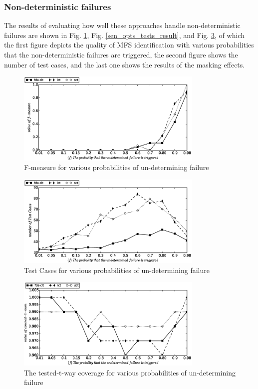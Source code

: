 \documentclass[journal,12pt,onecolumn,draftclsnofoot,]{IEEEtran}
\begin{document}
\subsubsection{Non-deterministic failures}
The results of evaluating how well these approaches handle non-deterministic failures are shown in Fig. \ref{sen_und_f_measure_result}, Fig. \ref{sen_opts_tests_result}, and Fig. \ref{sen_pro_t_tuple_result}, of which the first figure depicts the quality of MFS identification with various probabilities that the non-deterministic failures are triggered, the second figure shows the number of test cases, and the last one shows the results of the masking effects.

\begin{figure}[htbp]
 \includegraphics[width=3.5in]{sen_und_f_measure.eps}
\caption{F-measure for various probabilities of un-determining failure}
\label{sen_und_f_measure_result}
\end{figure}


\begin{figure}[htbp]
 \includegraphics[width=3.5in]{sen_und_tests.eps}
\caption{Test Cases for various probabilities of un-determining failure}
\label{sen_und_tests_result}
\end{figure}

\begin{figure}[htbp]
 \includegraphics[width=3.5in]{sen_pro_t_tuple.eps}
\caption{The tested-t-way coverage for various probabilities of un-determining failure}
\label{sen_pro_t_tuple_result}
\end{figure}
\end{document}
